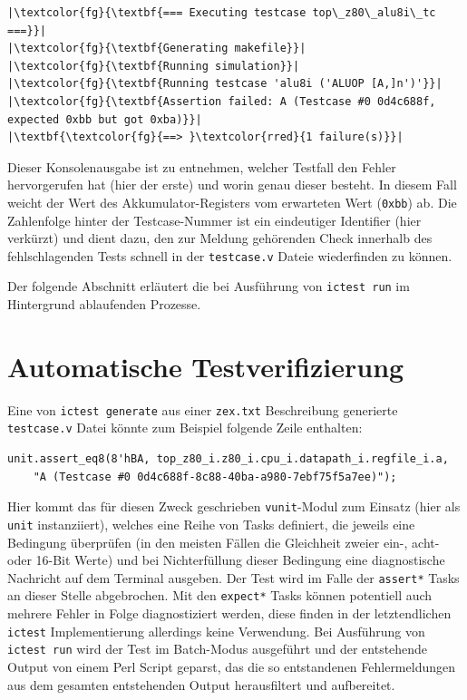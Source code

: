 \documentclass[ngerman, cd=lightcolor]{tudscrreprt}
\begin{document}
\begin{verbatim}
|\textcolor{fg}{\textbf{=== Executing testcase top\_z80\_alu8i\_tc ===}}|
|\textcolor{fg}{\textbf{Generating makefile}}|
|\textcolor{fg}{\textbf{Running simulation}}|
|\textcolor{fg}{\textbf{Running testcase 'alu8i ('ALUOP [A,]n')'}}|
|\textcolor{fg}{\textbf{Assertion failed: A (Testcase #0 0d4c688f, expected 0xbb but got 0xba)}}|
|\textbf{\textcolor{fg}{==> }\textcolor{rred}{1 failure(s)}}|
\end{verbatim}

\noindent
Dieser Konsolenausgabe ist zu entnehmen, welcher Testfall den Fehler
hervorgerufen hat (hier der erste) und worin genau dieser besteht. In diesem
Fall weicht der Wert des Akkumulator-Registers vom erwarteten Wert
(\texttt{0xbb}) ab. Die Zahlenfolge hinter der Testcase-Nummer ist ein
eindeutiger Identifier (hier verkürzt) und dient dazu, den zur Meldung
gehörenden Check innerhalb des fehlschlagenden Tests schnell in der
\texttt{testcase.v} Dateie wiederfinden zu können.

Der folgende Abschnitt erläutert die bei Ausführung von \texttt{ictest run} im
Hintergrund ablaufenden Prozesse.

\section{Automatische Testverifizierung\label{ch:automated-verification}}

Eine von \texttt{ictest generate} aus einer \texttt{zex.txt} Beschreibung
generierte \texttt{testcase.v} Datei könnte zum Beispiel folgende Zeile
enthalten:

\begin{center}
\begin{minipage}{.6\textwidth}
\begin{verbatim}
unit.assert_eq8(8'hBA, top_z80_i.z80_i.cpu_i.datapath_i.regfile_i.a,
    "A (Testcase #0 0d4c688f-8c88-40ba-a980-7ebf75f5a7ee)");
\end{verbatim}
\end{minipage}
\end{center}

\noindent
Hier kommt das für diesen Zweck geschrieben \texttt{vunit}-Modul zum Einsatz
(hier als \texttt{unit} instanziiert), welches eine Reihe von Tasks definiert,
die jeweils eine Bedingung überprüfen (in den meisten Fällen die Gleichheit
zweier ein-, acht- oder 16-Bit Werte) und bei Nichterfüllung dieser Bedingung
eine diagnostische Nachricht auf dem Terminal ausgeben. Der Test wird im Falle
der \texttt{assert*} Tasks an dieser Stelle abgebrochen. Mit den
\texttt{expect*} Tasks können potentiell auch mehrere Fehler in Folge
diagnostiziert werden, diese finden in der letztendlichen \texttt{ictest}
Implementierung allerdings keine Verwendung. Bei Ausführung von \texttt{ictest
run} wird der Test im Batch-Modus ausgeführt und der entstehende Output von
einem Perl Script geparst, das die so entstandenen Fehlermeldungen aus dem
gesamten entstehenden Output herausfiltert und aufbereitet.
\end{document}
